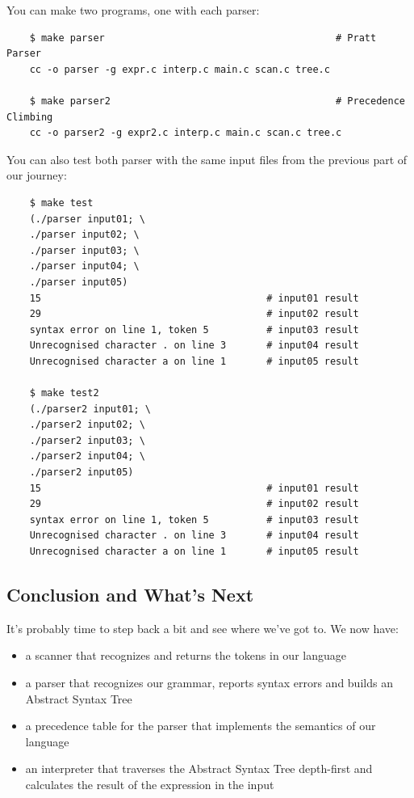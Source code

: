\documentclass[journal, onecolumn, 12pt]{IEEEtran}
\begin{document}
You can make two programs, one with each parser:
\begin{lstlisting}
    $ make parser                                        # Pratt Parser
    cc -o parser -g expr.c interp.c main.c scan.c tree.c
    
    $ make parser2                                       # Precedence Climbing
    cc -o parser2 -g expr2.c interp.c main.c scan.c tree.c
\end{lstlisting}

You can also test both parser with the same input files from the previous part of our journey:

\begin{lstlisting}
    $ make test
    (./parser input01; \
    ./parser input02; \
    ./parser input03; \
    ./parser input04; \
    ./parser input05)
    15                                       # input01 result
    29                                       # input02 result
    syntax error on line 1, token 5          # input03 result
    Unrecognised character . on line 3       # input04 result
    Unrecognised character a on line 1       # input05 result
    
    $ make test2
    (./parser2 input01; \
    ./parser2 input02; \
    ./parser2 input03; \
    ./parser2 input04; \
    ./parser2 input05)
    15                                       # input01 result
    29                                       # input02 result
    syntax error on line 1, token 5          # input03 result
    Unrecognised character . on line 3       # input04 result
    Unrecognised character a on line 1       # input05 result
\end{lstlisting}

\subsection{Conclusion and What's Next}

It's probably time to step back a bit and see where we've got to. We now have:

\begin{itemize}
  \item a scanner that recognizes and returns the tokens in our language
  \item a parser that recognizes our grammar, reports syntax errors and builds an Abstract Syntax Tree
  \item a precedence table for the parser that implements the semantics of our language
  \item an interpreter that traverses the Abstract Syntax Tree depth-first and calculates the result of the expression in the input
\end{itemize}
\end{document}
